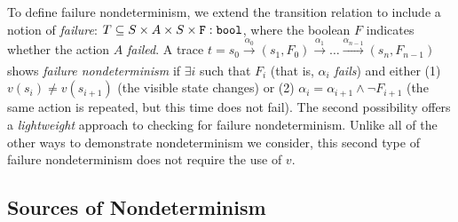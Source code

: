 To define failure nondeterminism, we extend the
transition relation to include a notion of \emph{failure}: $T \subseteq S
\times A \times S \times {\tt F: bool}$, where the boolean $F$ indicates
whether the action $A$ \emph{failed}.   A trace $t = s_0
\xrightarrow[]{\alpha_0} (s_1, F_0) \xrightarrow[]{\alpha_1} \ldots
\xrightarrow[]{\alpha_{n-1}} (s_n, F_{n-1})$ shows \emph{failure
  nondeterminism} if $\exists i$ such that $F_{i}$ (that is,
$\alpha_i$ \emph{fails}) and either (1) $v(s_{i}) \neq v(s_{i+1})$
(the visible state changes) or (2)
$\alpha_i = \alpha_{i+1} \wedge \neg F_{i+1}$ (the same action is
repeated, but this time does not fail).  The second possibility
offers a \emph{lightweight} approach to checking for failure
nondeterminism.  Unlike all of the other ways to demonstrate
nondeterminism we consider, this second type of failure nondeterminism does not
require the use of $v$.

\subsection{Sources of Nondeterminism}
\label{sec:sources}

